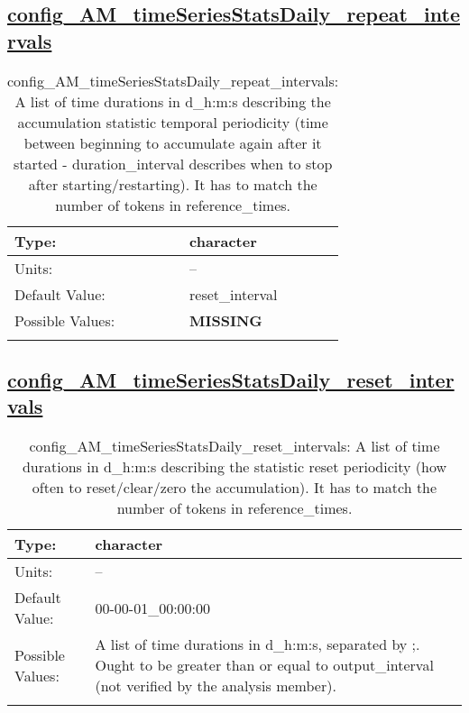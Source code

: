 \subsection[config\_AM\_timeSeriesStatsDaily\_repeat\_intervals]{\hyperref[sec:nm_tab_AM_timeSeriesStatsDaily]{config\_AM\_timeSeriesStatsDaily\_repeat\_intervals}}
\label{subsec:nm_sec_config_AM_timeSeriesStatsDaily_repeat_intervals}
\begin{center}
\begin{longtable}{| p{2.0in} || p{4.0in} |}
    \hline
    Type: & character \\
    \hline
    Units: & -- \\
    \hline
    Default Value: & reset\_interval \\
    \hline
    Possible Values: & {\bf \color{red} MISSING} \\
    \hline
    \caption{config\_AM\_timeSeriesStatsDaily\_repeat\_intervals: A list of time durations in d\_h:m:s describing the accumulation statistic temporal periodicity (time between beginning to accumulate again after it started - duration\_interval describes when to stop after starting/restarting). It has to match the number of tokens in reference\_times.}
\end{longtable}
\end{center}
\subsection[config\_AM\_timeSeriesStatsDaily\_reset\_intervals]{\hyperref[sec:nm_tab_AM_timeSeriesStatsDaily]{config\_AM\_timeSeriesStatsDaily\_reset\_intervals}}
\label{subsec:nm_sec_config_AM_timeSeriesStatsDaily_reset_intervals}
\begin{center}
\begin{longtable}{| p{2.0in} || p{4.0in} |}
    \hline
    Type: & character \\
    \hline
    Units: & -- \\
    \hline
    Default Value: & 00-00-01\_00:00:00 \\
    \hline
    Possible Values: & A list of time durations in d\_h:m:s, separated by ;. Ought to be greater than or equal to output\_interval (not verified by the analysis member). \\
    \hline
    \caption{config\_AM\_timeSeriesStatsDaily\_reset\_intervals: A list of time durations in d\_h:m:s describing the statistic reset periodicity (how often to reset/clear/zero the accumulation). It has to match the number of tokens in reference\_times.}
\end{longtable}
\end{center}

